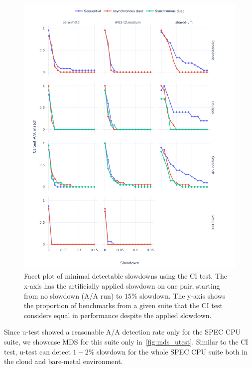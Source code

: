 \begin{figure}
	\centering
	\includegraphics[width=1\linewidth]{./figures/mds_citest.pdf}
	\caption{
		Facet plot of minimal detectable slowdowns using the CI test.
		The \mbox{x-axis} has the artificially applied slowdown on one pair, starting from no slowdown (A/A run) to $15\%$ slowdown.
		The \mbox{y-axis} shows the proportion of benchmarks from a given suite that the CI test considers equal in performance despite the applied slowdown.
	}
	\label{fig:mds_citest}
\end{figure}

Since \mbox{u-test} showed a reasonable A/A detection rate only for the SPEC CPU suite, we showcase MDS for this suite only in~\cref{fig:mds_utest}.
Similar to the CI test, \mbox{u-test} can detect $1-2\%$ slowdown for the whole SPEC CPU suite both in the cloud and \mbox{bare-metal} environment.

